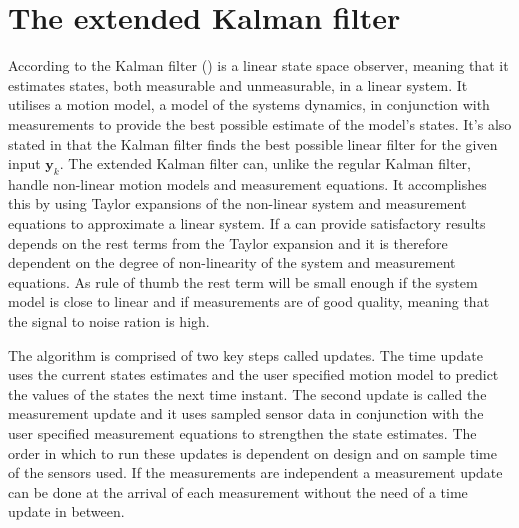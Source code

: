 \section{The extended Kalman filter}
According to \citet{sensorfusion} the Kalman filter (\abbrKF) is a linear state space observer, meaning that it estimates states, both measurable and unmeasurable, in a linear system. It utilises a motion model, a model of the systems dynamics, in conjunction with measurements to provide the best possible estimate of the model's states. It's also stated in \citet{sensorfusion} that the Kalman filter finds the best possible linear filter for the given input $\boldsymbol{y}_{k}$. The extended Kalman filter can, unlike the regular Kalman filter, handle non-linear motion models and measurement equations. It accomplishes this by using Taylor expansions of the non-linear system and measurement equations to approximate a linear system. If a \abbrEKF can provide satisfactory results depends on the rest terms from the Taylor expansion and it is therefore dependent on the degree of non-linearity of the system and measurement equations\citep{sensorfusion}. As rule of thumb the rest term will be small enough if the system model is close to linear and if measurements are of good quality, meaning that the signal to noise ration is high\citep{sensorfusion}. 

The \abbrEKF algorithm is comprised of two key steps called updates.
The time update uses the current states estimates and the user specified motion model to predict the values of the states the next time instant. The second update is called the measurement update and it uses sampled sensor data in conjunction with the user specified measurement equations to strengthen the state estimates. 
The order in which to run these updates is dependent on design and on sample time of the sensors used. If the measurements are independent a measurement update can be done at the arrival of each measurement without the need of a time update in between\citep[p.170]{sensorfusion}.

